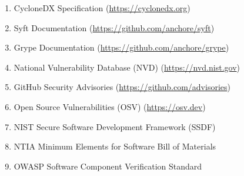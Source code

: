 \begin{enumerate}
\item CycloneDX Specification (\url{https://cyclonedx.org})
\item Syft Documentation (\url{https://github.com/anchore/syft})
\item Grype Documentation (\url{https://github.com/anchore/grype})
\item National Vulnerability Database (NVD) (\url{https://nvd.nist.gov})
\item GitHub Security Advisories (\url{https://github.com/advisories})
\item Open Source Vulnerabilities (OSV) (\url{https://osv.dev})
\item NIST Secure Software Development Framework (SSDF)
\item NTIA Minimum Elements for Software Bill of Materials
\item OWASP Software Component Verification Standard
\end{enumerate}

\vspace{0.8cm}